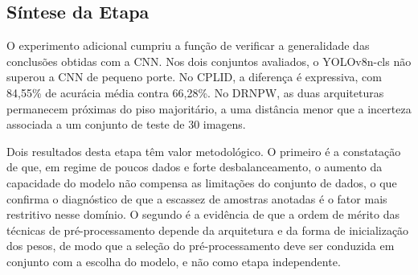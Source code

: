 \subsection{Síntese da Etapa}

O experimento adicional cumpriu a função de verificar a generalidade das conclusões obtidas com a CNN. Nos dois conjuntos avaliados, o YOLOv8n-cls não superou a CNN de pequeno porte. No CPLID, a diferença é expressiva, com 84,55\% de acurácia média contra 66,28\%. No DRNPW, as duas arquiteturas permanecem próximas do piso majoritário, a uma distância menor que a incerteza associada a um conjunto de teste de 30 imagens.

Dois resultados desta etapa têm valor metodológico. O primeiro é a constatação de que, em regime de poucos dados e forte desbalanceamento, o aumento da capacidade do modelo não compensa as limitações do conjunto de dados, o que confirma o diagnóstico de que a escassez de amostras anotadas é o fator mais restritivo nesse domínio. O segundo é a evidência de que a ordem de mérito das técnicas de pré-processamento depende da arquitetura e da forma de inicialização dos pesos, de modo que a seleção do pré-processamento deve ser conduzida em conjunto com a escolha do modelo, e não como etapa independente.



